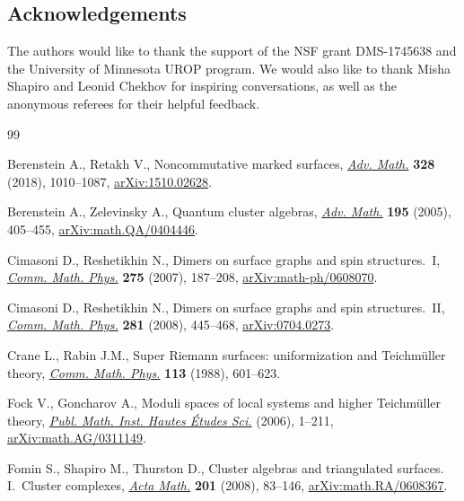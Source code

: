 \documentclass[pdftex]{sigma}
\numberwithin{equation}{section}
\begin{document}
\subsection*{Acknowledgements}

The authors would like to thank the support of the NSF grant DMS-1745638 and the University of Minnesota UROP program. We would also like to thank Misha Shapiro and Leonid Chekhov for inspiring conversations, as well as the anonymous referees for their helpful feedback.

\begin{thebibliography}{99}
\footnotesize\itemsep=0pt

Berenstein A., Retakh V., Noncommutative marked surfaces, \href{https://doi.org/10.1016/j.aim.2018.02.014}{\textit{Adv. Math.}}
 \textbf{328} (2018), 1010--1087, \href{https://arxiv.org/abs/1510.02628}{arXiv:1510.02628}.

Berenstein A., Zelevinsky A., Quantum cluster algebras, \href{https://doi.org/10.1016/j.aim.2004.08.003}{\textit{Adv. Math.}}
 \textbf{195} (2005), 405--455, \href{https://arxiv.org/abs/math.QA/0404446}{arXiv:math.QA/0404446}.

Cimasoni D., Reshetikhin N., Dimers on surface graphs and spin structures.~{I},
 \href{https://doi.org/10.1007/s00220-007-0302-7}{\textit{Comm. Math. Phys.}} \textbf{275} (2007), 187--208,
 \href{https://arxiv.org/abs/math-ph/0608070}{arXiv:math-ph/0608070}.

Cimasoni D., Reshetikhin N., Dimers on surface graphs and spin
 structures.~{II}, \href{https://doi.org/10.1007/s00220-008-0488-3}{\textit{Comm. Math. Phys.}} \textbf{281} (2008), 445--468,
 \href{https://arxiv.org/abs/0704.0273}{arXiv:0704.0273}.

Crane L., Rabin J.M., Super {R}iemann surfaces: uniformization and
 {T}eichm\"uller theory, \href{https://doi.org/10.1007/BF01223239}{\textit{Comm. Math. Phys.}} \textbf{113} (1988),
 601--623.

Fock V., Goncharov A., Moduli spaces of local systems and higher
 {T}eichm\"uller theory, \href{https://doi.org/10.1007/s10240-006-0039-4}{\textit{Publ. Math. Inst. Hautes \'Etudes Sci.}}
 (2006), 1--211, \href{https://arxiv.org/abs/math.AG/0311149}{arXiv:math.AG/0311149}.

Fomin S., Shapiro M., Thurston D., Cluster algebras and triangulated surfaces.
 {I}.~{C}luster complexes, \href{https://doi.org/10.1007/s11511-008-0030-7}{\textit{Acta Math.}} \textbf{201} (2008), 83--146,
 \href{https://arxiv.org/abs/math.RA/0608367}{arXiv:math.RA/0608367}.


\end{thebibliography}
\end{document}
